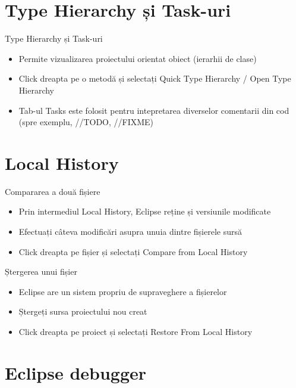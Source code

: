 \documentclass{beamer}
\begin{document}
\section{Type Hierarchy și Task-uri}

\begin{frame}{Type Hierarchy și Task-uri }
  \begin{itemize}
  \item Permite vizualizarea proiectului orientat obiect (ierarhii de clase)
	\pause
  \item Click dreapta pe o metodă și selectați Quick Type Hierarchy / Open Type Hierarchy
  \pause
  \item Tab-ul Tasks este folosit pentru intepretarea diverselor comentarii din cod (spre exemplu, //TODO, //FIXME)
  \end{itemize}
\end{frame}

\section{Local History}

\begin{frame}{Compararea a două fișiere}
  \begin{itemize}
  \item Prin intermediul Local History, Eclipse reține și versiunile modificate 
  \pause
  \item Efectuați câteva modificări asupra unuia dintre fișierele sursă
  \pause
  \item Click dreapta pe fișier și selectați Compare from Local History
  \end{itemize}
\end{frame}

\begin{frame}{Ștergerea unui fișier}
  \begin{itemize}
  \item Eclipse are un sistem propriu de supraveghere a fișierelor
  \pause
  \item Ștergeți sursa proiectului nou creat
  \pause
  \item Click dreapta pe proiect și selectați Restore From Local History
  \end{itemize}
\end{frame}

\section{Eclipse debugger}
\end{document}
